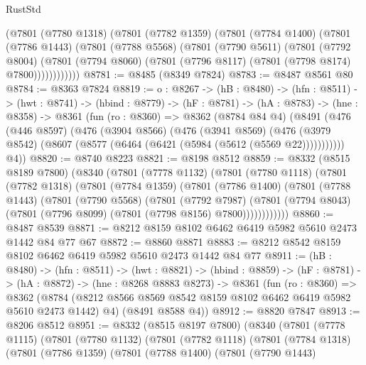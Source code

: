 \begin{lexlean}{RustStd}
\begin{coremodule}
        (@7801
          (@7780 @1318)
          (@7801
            (@7782 @1359)
            (@7801
              (@7784 @1400)
              (@7801
                (@7786 @1443)
                (@7801
                  (@7788 @5568)
                  (@7801
                    (@7790 @5611)
                    (@7801
                      (@7792 @8004)
                      (@7801
                        (@7794 @8060)
                        (@7801 (@7796 @8117) (@7801 (@7798 @8174) @7800))))))))))))
@8781 := @8485 (@8349 @7824)
@8783 := @8487 @8561 @80
@8784 := @8363 @7824
@8819 := {o : @8267} ->
  (hB : @8480) ->
  (hfn : @8511) ->
  (hwt : @8741) ->
  (hbind : @8779) ->
  (hF : @8781) ->
  (hA : @8783) ->
  (hne : @8358) ->
  @8361
    (fun (ro : @8360) =>
    @8362
      (@8784 @84 @4)
      (@8491
        (@476
          (@446 @8597)
          (@476
            (@3904 @8566)
            (@476
              (@3941 @8569)
              (@476 (@3979 @8542) (@8607 (@8577 (@6464 (@6421 (@5984 (@5612 (@5569 @22)))))))))))
        @4))
@8820 := @8740 @8223
@8821 := @8198 @8512
@8859 := @8332
    (@8515 @8189 @7800)
    (@8340
      (@7801
        (@7778 @1132)
        (@7801
          (@7780 @1118)
          (@7801
            (@7782 @1318)
            (@7801
              (@7784 @1359)
              (@7801
                (@7786 @1400)
                (@7801
                  (@7788 @1443)
                  (@7801
                    (@7790 @5568)
                    (@7801
                      (@7792 @7987)
                      (@7801
                        (@7794 @8043)
                        (@7801 (@7796 @8099) (@7801 (@7798 @8156) @7800))))))))))))
@8860 := @8487 @8539
@8871 := @8212 @8159 @8102 @6462 @6419 @5982 @5610 @2473 @1442 @84 @77 @67
@8872 := @8860 @8871
@8883 := @8212 @8542 @8159 @8102 @6462 @6419 @5982 @5610 @2473 @1442 @84 @77
@8911 := (hB : @8480) ->
  (hfn : @8511) ->
  (hwt : @8821) ->
  (hbind : @8859) ->
  (hF : @8781) ->
  (hA : @8872) ->
  (hne : @8268 @8883 @8273) ->
  @8361
    (fun (ro : @8360) =>
    @8362
      (@8784 (@8212 @8566 @8569 @8542 @8159 @8102 @6462 @6419 @5982 @5610 @2473 @1442) @4)
      (@8491 @8588 @4))
@8912 := @8820 @7847
@8913 := @8206 @8512
@8951 := @8332
    (@8515 @8197 @7800)
    (@8340
      (@7801
        (@7778 @1115)
        (@7801
          (@7780 @1132)
          (@7801
            (@7782 @1118)
            (@7801
              (@7784 @1318)
              (@7801
                (@7786 @1359)
                (@7801
                  (@7788 @1400)
                  (@7801
                    (@7790 @1443)

\end{coremodule}
\end{lexlean}
